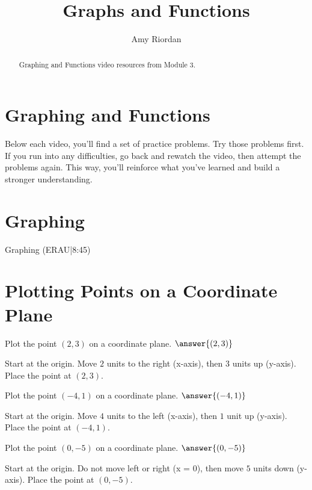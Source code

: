 \documentclass{ximera}
\title{Graphs and Functions}
\author{Amy Riordan}
\begin{document}
\begin{abstract}
Graphing and Functions video resources from Module 3.
\end{abstract}
\maketitle

\section*{Graphing and Functions}

Below each video, you’ll find a set of practice problems. Try those problems first. If you run into any difficulties, go back and rewatch the video, then attempt the problems again. This way, you’ll reinforce what you’ve learned and build a stronger understanding.

\section*{Graphing}

Graphing (ERAU|8:45)



\section*{Plotting Points on a Coordinate Plane}

\begin{problem}
Plot the point $(2, 3)$ on a coordinate plane. $\answer{(2, 3)}$
\begin{feedback}
Start at the origin. Move $2$ units to the right (x-axis), then $3$ units up (y-axis). Place the point at $(2, 3)$.
\end{feedback}
\end{problem}

\begin{problem}
Plot the point $(-4, 1)$ on a coordinate plane. $\answer{(-4, 1)}$
\begin{feedback}
Start at the origin. Move $4$ units to the left (x-axis), then $1$ unit up (y-axis). Place the point at $(-4, 1)$.
\end{feedback}
\end{problem}

\begin{problem}
Plot the point $(0, -5)$ on a coordinate plane. $\answer{(0, -5)}$
\begin{feedback}
Start at the origin. Do not move left or right (x = 0), then move $5$ units down (y-axis). Place the point at $(0, -5)$.
\end{feedback}
\end{problem}
\end{document}
